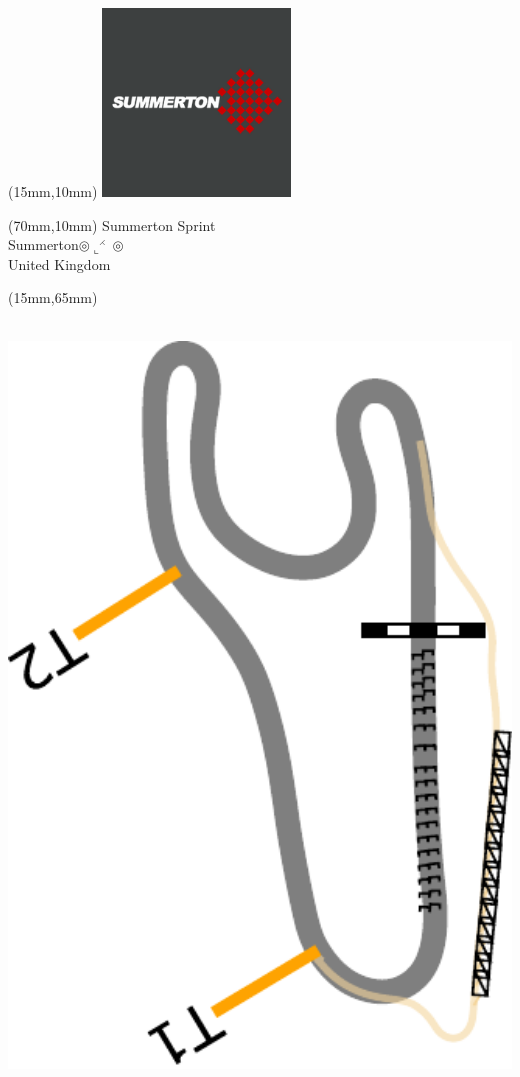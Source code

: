 \null\newpage
\begin{textblock*}{50mm}(15mm,10mm)%
\includegraphics[width=50mm]{LG/SUMM.png}
\end{textblock*}
\begin{textblock*}{130mm}(70mm,10mm)%
{\fontsize{20}{20}\selectfont Summerton Sprint\\}
{\fontsize{16}{16}\selectfont Summerton\hfill $\circledcirc\llcorner^{\rightthreetimes}\circledcirc$\\}
{\fontsize{12}{12}\selectfont United Kingdom\\}
\end{textblock*}
\begin{textblock*}{185mm}(15mm,65mm)%
\centering
\mbox{\includegraphics[width=185mm,height=210mm,keepaspectratio]{PT/SUMMSP.pdf}}
\end{textblock*}
